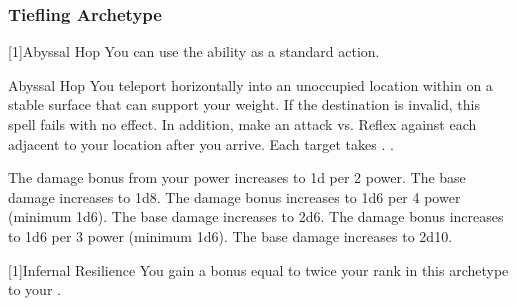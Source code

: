         \subsubsection{Tiefling Archetype}
            [1]{Abyssal Hop} You can use the  ability as a standard action.
            \begin{magicalactiveability}{Abyssal Hop}
                \rankline
                You teleport horizontally into an unoccupied location within \shortrange on a stable surface that can support your weight.
                If the destination is invalid, this spell fails with no effect.
                In addition, make an attack vs. Reflex against each  adjacent to your location after you arrive.
                \hit Each target takes .
                \miss {}.

                \rankline
                 The damage bonus from your power increases to \plus1d per 2 power.
                 The base damage increases to 1d8.
                 The damage bonus increases to 1d6 per 4 power (minimum 1d6).
                 The base damage increases to 2d6.
                 The damage bonus increases to 1d6 per 3 power (minimum 1d6).
                 The base damage increases to 2d10.
            \end{magicalactiveability}

            [1]{Infernal Resilience} You gain a bonus equal to twice your rank in this archetype to your .

